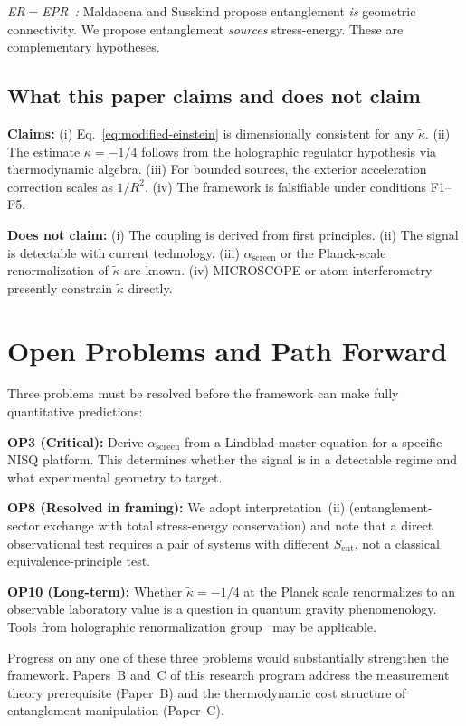\documentclass[12pt,twocolumn]{article}
\newcommand{\kt}{\tilde{\kappa}}
\newcommand{\Sent}{S_{\mathrm{ent}}}
\newcommand{\asc}{\alpha_{\mathrm{screen}}}
\begin{document}
\textit{ER$=$EPR~\cite{Maldacena2013}:} Maldacena and Susskind propose entanglement
\emph{is} geometric connectivity.  We propose entanglement \emph{sources} stress-energy.
These are complementary hypotheses.

\subsection{What this paper claims and does not claim}

\textbf{Claims:}
(i) Eq.~\eqref{eq:modified-einstein} is dimensionally consistent for any $\kt$.
(ii) The estimate $\kt = -1/4$ follows from the holographic regulator hypothesis via
    thermodynamic algebra.
(iii) For bounded sources, the exterior acceleration correction scales as $1/R^2$.
(iv) The framework is falsifiable under conditions F1--F5.

\textbf{Does not claim:}
(i) The coupling is derived from first principles.
(ii) The signal is detectable with current technology.
(iii) $\asc$ or the Planck-scale renormalization of $\kt$ are known.
(iv) MICROSCOPE or atom interferometry presently constrain $\kt$ directly.

\section{Open Problems and Path Forward}
\label{sec:open}

Three problems must be resolved before the framework can make fully quantitative predictions:

\textbf{OP3 (Critical):} Derive $\asc$ from a Lindblad master equation for a specific
NISQ platform.  This determines whether the signal is in a detectable regime and what
experimental geometry to target.

\textbf{OP8 (Resolved in framing):} We adopt interpretation~(ii) (entanglement-sector
exchange with total stress-energy conservation) and note that a direct observational test
requires a pair of systems with different $\Sent$, not a classical equivalence-principle test.

\textbf{OP10 (Long-term):} Whether $\kt = -1/4$ at the Planck scale renormalizes to an
observable laboratory value is a question in quantum gravity phenomenology.  Tools from
holographic renormalization group~\cite{deHaro2000} may be applicable.

Progress on any one of these three problems would substantially strengthen the framework.
Papers~B and~C of this research program address the measurement theory prerequisite (Paper~B)
and the thermodynamic cost structure of entanglement manipulation (Paper~C).
\end{document}
